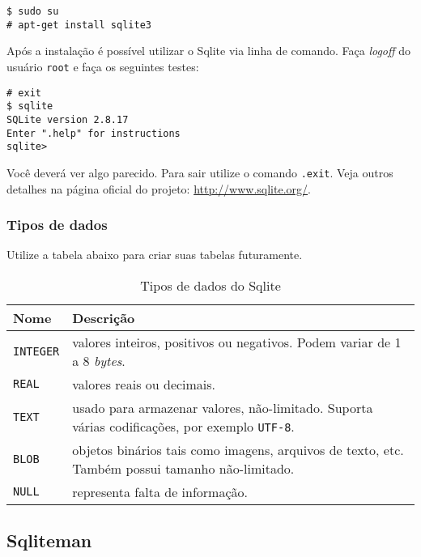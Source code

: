 \begin{flushleft}
\texttt{\$ sudo su \\
\# apt-get install sqlite3 \\}
\end{flushleft}

Após a instalação é possível utilizar o Sqlite via linha de comando. Faça \textit{logoff} do usuário
\texttt{root} e faça os seguintes testes:

\begin{flushleft}
\texttt{\# exit \\
\$ sqlite \\
SQLite version 2.8.17\\
Enter ".help" for instructions\\
sqlite>\\}
\end{flushleft}

Você deverá ver algo parecido. Para sair utilize o comando \texttt{.exit}. Veja outros detalhes na página
oficial do projeto: \url{http://www.sqlite.org/}.

\subsubsection{Tipos de dados}

Utilize a tabela abaixo para criar suas tabelas futuramente.

\begin{table}[H]
\begin{tabularx}{400pt}{lX}
\hline
\textbf{Nome} & \textbf{Descrição} \\
\hline
\texttt{INTEGER} & valores inteiros, positivos ou negativos. Podem variar de 1 a 8 \textit{bytes}.\\
\texttt{REAL} & valores reais ou decimais.\\
\texttt{TEXT} & usado para armazenar valores, não-limitado. Suporta várias codificações, por exemplo \texttt{UTF-8}.\\
\texttt{BLOB} & objetos binários tais como imagens, arquivos de texto, etc. Também possui tamanho não-limitado.\\
\texttt{NULL} & representa falta de informação.\\
\hline
\end{tabularx}
\caption{Tipos de dados do Sqlite}
\end{table}

\subsection{Sqliteman}

